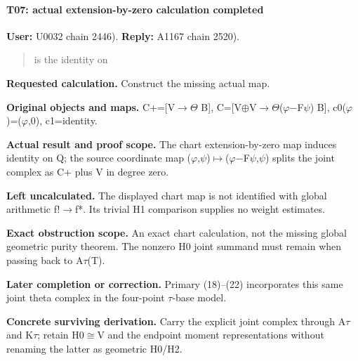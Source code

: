 \paragraph{T07: actual extension-by-zero calculation
completed}\label{t07-actual-extension-by-zero-calculation-completed}

\textbf{User:} U0032
\protect{} chain 2446).
\textbf{Reply:} A1167
\protect{} chain 2520).

\begin{quote}
is the identity on
\end{quote}

\textbf{Requested calculation.} Construct the missing actual map.

\textbf{Original objects and maps.}
C+=[V\allowbreak{}\ensuremath{→}\allowbreak{}\allowbreak{}\ensuremath{Θ}\allowbreak{}
B{]},
C=[V\allowbreak{}\ensuremath{⊕}\allowbreak{}V\allowbreak{}\ensuremath{→}\allowbreak{}\allowbreak{}\ensuremath{Θ}\allowbreak{}(\allowbreak{}\ensuremath{φ}\allowbreak{}\allowbreak{}\ensuremath{−}\allowbreak{}F\allowbreak{}\ensuremath{ψ}\allowbreak{})
B{]},
c0(\allowbreak{}\ensuremath{φ}\allowbreak{})=(\allowbreak{}\ensuremath{φ}\allowbreak{},0),
c1=identity.

\textbf{Actual result and proof scope.} The chart extension-by-zero map
induces identity on Q; the source coordinate map
(\allowbreak{}\ensuremath{φ}\allowbreak{},\allowbreak{}\ensuremath{ψ}\allowbreak{})\allowbreak{}\ensuremath{↦}\allowbreak{}(\allowbreak{}\ensuremath{φ}\allowbreak{}\allowbreak{}\ensuremath{−}\allowbreak{}F\allowbreak{}\ensuremath{ψ}\allowbreak{},\allowbreak{}\ensuremath{ψ}\allowbreak{})
splits the joint complex as C+ plus V in degree zero.

\textbf{Left uncalculated.} The displayed chart map is not identified
with global arithmetic f!\allowbreak{}\ensuremath{→}\allowbreak{}f*. Its
trivial H1 comparison supplies no weight estimates.

\textbf{Exact obstruction scope.} An exact chart calculation, not the
missing global geometric purity theorem. The nonzero H0 joint summand
must remain when passing back to
A\allowbreak{}\ensuremath{τ}\allowbreak{}(T).

\textbf{Later completion or correction.} Primary (18)--(22) incorporates
this same joint theta complex in the four-point
\allowbreak{}\ensuremath{τ}\allowbreak{}-base model.

\textbf{Concrete surviving derivation.} Carry the explicit joint complex
through A\allowbreak{}\ensuremath{τ}\allowbreak{} and
K\allowbreak{}\ensuremath{τ}\allowbreak{}; retain
H0\allowbreak{}\ensuremath{≅}\allowbreak{}V and the endpoint moment
representations without renaming the latter as geometric H0/H2.

